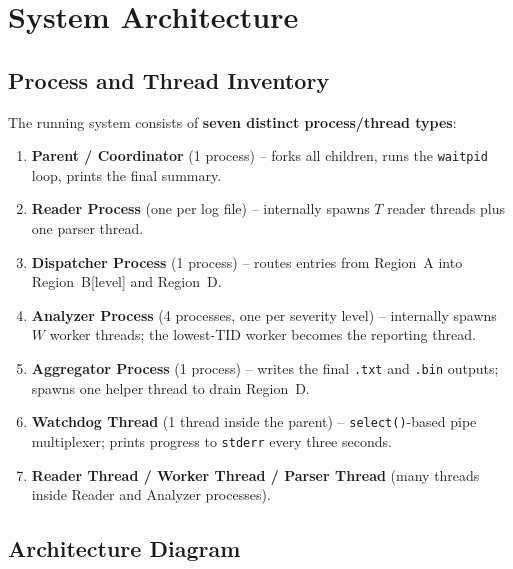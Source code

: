 \documentclass[11pt,a4paper]{article}
\newcommand{\code}[1]{\texttt{\small #1}}
\begin{document}
\section{System Architecture}

\subsection{Process and Thread Inventory}

The running system consists of \textbf{seven distinct process/thread types}:

\begin{enumerate}
    \item \textbf{Parent / Coordinator} (1 process) -- forks all children,
        runs the \code{waitpid} loop, prints the final summary.
    \item \textbf{Reader Process} (one per log file) -- internally spawns
        $T$ reader threads plus one parser thread.
    \item \textbf{Dispatcher Process} (1 process) -- routes entries from
        Region~A into Region~B[level] and Region~D.
    \item \textbf{Analyzer Process} (4 processes, one per severity level)
        -- internally spawns $W$ worker threads; the lowest-TID worker
        becomes the reporting thread.
    \item \textbf{Aggregator Process} (1 process) -- writes the final
        \code{.txt} and \code{.bin} outputs; spawns one helper thread to
        drain Region~D.
    \item \textbf{Watchdog Thread} (1 thread inside the parent) --
        \code{select()}-based pipe multiplexer; prints progress to
        \code{stderr} every three seconds.
    \item \textbf{Reader Thread / Worker Thread / Parser Thread} (many
        threads inside Reader and Analyzer processes).
\end{enumerate}

\subsection{Architecture Diagram}
\end{document}

